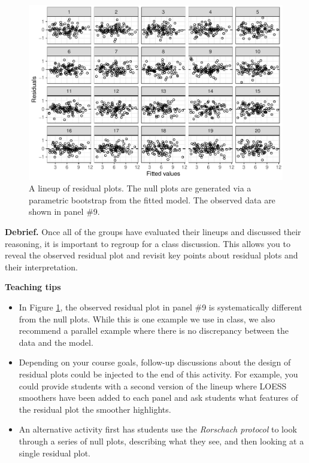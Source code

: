 \documentclass[12pt]{article}
\begin{document}
\begin{figure}
\centering
\includegraphics{residual_lineup.pdf}
\caption{\label{fig:lineupresid} A lineup of residual plots. The null
plots are generated via a parametric bootstrap from the fitted model.
The observed data are shown in panel \#9.}
\end{figure}

\textbf{Debrief.} Once all of the groups have evaluated their lineups
and discussed their reasoning, it is important to regroup for a class
discussion. This allows you to reveal the observed residual plot and
revisit key points about residual plots and their interpretation.

\textbf{Teaching tips}

\begin{itemize}
\item
  In Figure \ref{fig:lineupresid}, the observed residual plot in panel
  \#9 is systematically different from the null plots. While this is one
  example we use in class, we also recommend a parallel example where
  there is no discrepancy between the data and the model.
\item
  Depending on your course goals, follow-up discussions about the design
  of residual plots could be injected to the end of this activity. For
  example, you could provide students with a second version of the
  lineup where LOESS smoothers have been added to each panel and ask
  students what features of the residual plot the smoother highlights.
\item
  An alternative activity first has students use the
  \emph{Rorschach protocol} \citep{Buja-2009bd} to look through a series
  of null plots, describing what they see, and then looking at a single
  residual plot.
\end{itemize}
\end{document}
